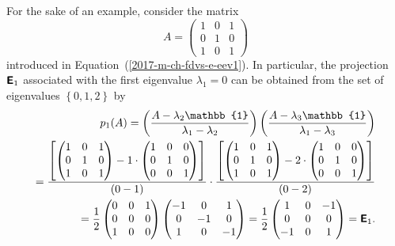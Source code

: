 {\color{blue}
\bexample
For the sake of an example, consider the matrix
\begin{equation}
A=
\begin{pmatrix}
1&0&1\\
0&1&0\\
1&0&1
\end{pmatrix}
\end{equation}
introduced in Equation~(\ref{2017-m-ch-fdvs-e-eev1}).
In particular, the projection $\textsf{\textbf{E}}_1$ associated with the first eigenvalue $\lambda_1=0$
can be obtained from  the set of eigenvalues $\left\{  0,1,2 \right\}$ by
\begin{equation}
\begin{split}
p_1(A)=
\left( \frac{A-\lambda_2\mathbb{1}}{\lambda_1-\lambda_2} \right)
\left( \frac{A-\lambda_3\mathbb{1}}{\lambda_1-\lambda_3} \right) \\
=
\frac{
\left[
\begin{pmatrix}
1&0&1\\
0&1&0\\
1&0&1
\end{pmatrix}
-
1\cdot
\begin{pmatrix}
1&0&0\\
0&1&0\\
0&0&1
\end{pmatrix}
\right]}
{(0-1)}
\cdot
\frac{
\left[
\begin{pmatrix}
1&0&1\\
0&1&0\\
1&0&1
\end{pmatrix}
-
2\cdot
\begin{pmatrix}
1&0&0\\
0&1&0\\
0&0&1
\end{pmatrix}
\right]}
{(0-2)}
\\
=
\frac{1}{2}
\begin{pmatrix}
0&0&1\\
0&0&0\\
1&0&0
\end{pmatrix}
\begin{pmatrix}
-1&0&1\\
0&-1&0\\
1&0&-1
\end{pmatrix}
=
\frac{1}{2}
\begin{pmatrix}
1&0&-1\\
0&0&0\\
-1&0&1
\end{pmatrix}
=\textsf{\textbf{E}}_1.
\end{split}
\end{equation}

}
